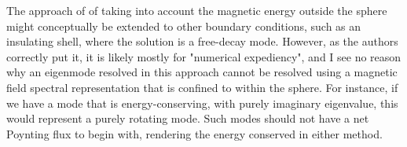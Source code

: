 The approach of \citet{gerick_interannual_2024} of taking into account the magnetic energy outside the sphere might conceptually be extended to other boundary conditions, such as an insulating shell, where the solution is a free-decay mode. However, as the authors correctly put it, it is likely mostly for "numerical expediency", and I see no reason why an eigenmode resolved in this approach cannot be resolved using a magnetic field spectral representation that is confined to within the sphere.
For instance, if we have a mode that is energy-conserving, with purely imaginary eigenvalue, this would represent a purely rotating mode. Such modes should not have a net Poynting flux to begin with, rendering the energy conserved in either method.

